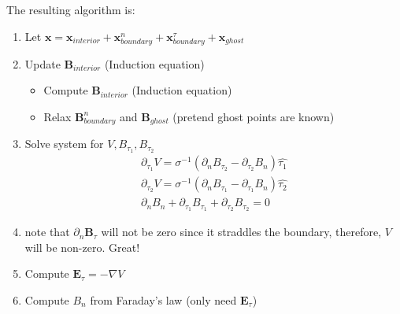 \documentclass[11pt]{article}
\newcommand{\PD}{\partial}
\newcommand{\E}{\mathbf{E}}
\begin{document}
The resulting algorithm is:

\begin{enumerate}
\setlength\itemsep{-1em}
\item Let $\mathbf{x}=\mathbf{x}_{interior}+\mathbf{x}_{boundary}^{n}+\mathbf{x}_{boundary}^{\tau}+\mathbf{x}_{ghost}$
\item Update $\mathbf{B}_{interior}$ (Induction equation)
\begin{itemize}
\setlength\itemsep{-1em}
\item Compute $\mathbf{B}_{interior}$ (Induction equation)
\item Relax $\mathbf{B}_{boundary}^n$ and $\mathbf{B}_{ghost}$ (pretend ghost points are known)
\end{itemize}
\item Solve system for $V,B_{\tau_1},B_{\tau_2}$
\begin{equation}\begin{aligned}
  \PD_{\tau_1} V = \sigma^{-1}(\PD_n B_{\tau_2} - \PD_{\tau_2} B_n) \hat{\tau_1} \\
  \PD_{\tau_2} V = \sigma^{-1} (\PD_n B_{\tau_1} - \PD_{\tau_1} B_n) \hat{\tau_2} \\
  \PD_n B_n + \PD_{\tau_1} B_{\tau_1} + \PD_{\tau_2} B_{\tau_2} = 0
\end{aligned}\end{equation}
\item note that $\PD_n \mathbf{B}_{\tau}$ will not be zero since it straddles the boundary, therefore, $V$ will be non-zero. Great!
\item Compute $\E_{\tau} = -\nabla V$
\item Compute $B_{n}$ from Faraday's law (only need $\E_{\tau}$)
\end{enumerate}

\newpage
\end{document}
